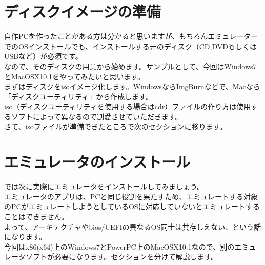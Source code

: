 \documentclass[b5paper,10pt]{jsarticle}
\begin{document}
\begin{multicols*}{3}
\section{ディスクイメージの準備}
自作PCを作ったことがある方は分かると思いますが、もちろんエミュレーターでのOSインストールでも、インストールする元のディスク（CD,DVDもしくはUSBなど）が必須です。\\
なので、そのディスクの用意から始めます。サンプルとして、今回はWindows7とMacOSX10.1をやってみたいと思います。\\
まずはディスクをisoイメージ化します。WindowsならImgBurnなどで、Macなら「ディスクユーティリティ」から作成します。\\
iso（ディスクユーティリティを使用する場合はcdr）ファイルの作り方は使用するソフトによって異なるので割愛させていただきます。\\
さて、isoファイルが準備できたところで次のセクションに移ります。\\
\section{エミュレータのインストール}
では次に実際にエミュレータをインストールしてみましょう。\\
エミュレータのアプリは、PCと同じ役割を果たすため、エミュレートする対象のPCがエミュレートしようとしているOSに対応していないとエミュレートすることはできません。\\
よって、アーキテクチャやbios/UEFIの異なるOS同士は共存しえない、という話になります。\\
今回はx86(x64)上のWindows7とPowerPC上のMacOSX10.1なので、別のエミュレータソフトが必要になります。セクションを分けて解説します。

\end{multicols*}
\end{document}
